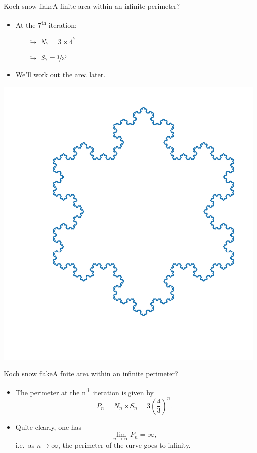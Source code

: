 \documentclass[usenames,dvipsnames,svgnames,10pt,aspectratio=169]{beamer}
\begin{document}
\begin{frame}[t, c]{Koch snow flake}{A finite area within an infinite perimeter?}
	\centering
	\begin{minipage}{.48\textwidth}
		\begin{itemize}
			\item At the 7\textsuperscript{th} iteration:
			\begin{itemize}
				\item[$\hookrightarrow$] $N_7 = 3 \times 4^7$
				\item[$\hookrightarrow$] $S_7 = \nicefrac{1}{3^7}$
			\end{itemize}

			\bigskip

			\item We'll work out the area later.
		\end{itemize}
	\end{minipage}%
	\hfill
	\begin{minipage}{.48\textwidth}
		\centering
		\includegraphics[width=.8\textwidth]{koch_7_it}
	\end{minipage}

	\vspace{1cm}
\end{frame}

\begin{frame}[t, c]{Koch snow flake}{A fnite area within an infinite perimeter?}
	\begin{itemize}
		\item The perimeter at the n\textsuperscript{th} iteration is given by
		$$
		P_n = N_n \times S_n = 3 \displaystyle \left( \frac{4}{3} \right)^n.
		$$
		\item Quite clearly, one has
		$$
		\lim_{n \to \infty} P_n = \infty,
		$$
		i.e.\ as $n \to \infty$, the perimeter of the curve goes to infinity.
	\end{itemize}

	\vspace{1cm}
\end{frame}
\end{document}
